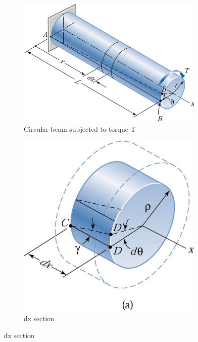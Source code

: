 \documentclass[12pt,a4paper]{article}	%
\begin{document}
	\begin{figure}[h!]
	\centering
	\begin{subfigure}[b]{0.5\linewidth}
		\includegraphics[width=\linewidth]{Ok.png}
		\caption{Circular beam subjected to torque T}
	\end{subfigure} \hspace{10mm}%
	\begin{subfigure}[b]{0.4\linewidth}
		\includegraphics[width=\linewidth]{Ok1.png}
		\caption{dx section}
	\end{subfigure}
\end{figure}
\end{document}
